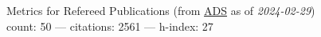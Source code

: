 Metrics for Refereed Publications (from \href{\adsurl}{ADS} as of \textit{2024-02-29}) \\count: 50 --- citations: 2561 --- h-index: 27